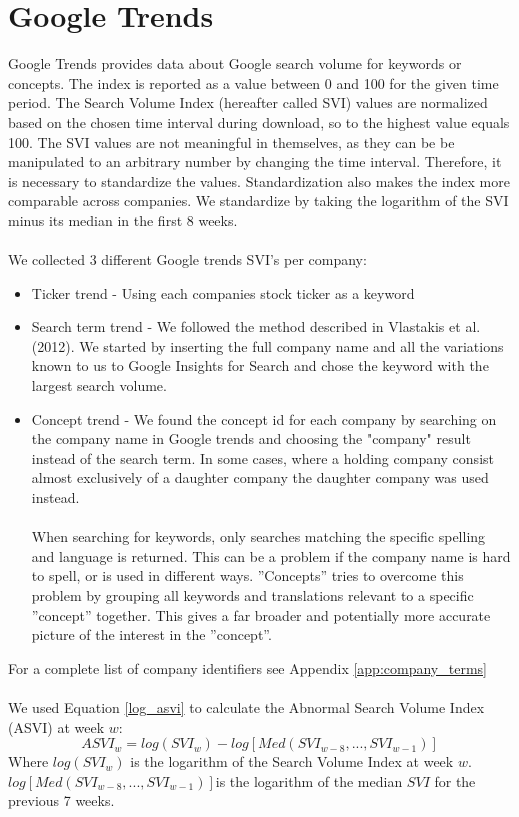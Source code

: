 \section{Google Trends}
Google Trends provides data about Google search volume for keywords or concepts. The index is reported as a value between 0 and 100 for the given time period. The Search Volume Index (hereafter called SVI) values are normalized based on the chosen time interval during download, so to the highest value equals 100. The SVI values are not meaningful in themselves, as they can be be manipulated to an arbitrary number by changing the time interval. Therefore, it is necessary to standardize the values. Standardization also makes the index more comparable across companies. We standardize by taking the logarithm of the SVI minus its median in the first 8 weeks. 
\\\\
We collected 3 different Google trends SVI's per company:
\begin{itemize}
\item Ticker trend - Using each companies stock ticker as a keyword
\item Search term trend - We followed the method described in Vlastakis et al. (2012). We started by inserting the full company name and all the variations known to us to Google Insights for Search and chose the keyword with the largest search volume.
\item Concept trend - We found the concept id for each company by searching on the company name in Google trends and choosing the "company" result instead of the search term. In some cases, where a holding company consist almost exclusively of a daughter company the daughter company was used instead.
\\\\
When searching for keywords, only searches matching the specific spelling and language is returned. This can be a problem if the company name is hard to spell, or is used in different ways. ”Concepts” tries to overcome this problem by grouping all keywords and translations relevant to a specific ”concept” together. This gives a far broader and potentially more accurate picture of the interest in the ”concept”.
\end{itemize}
For a complete list of company identifiers see Appendix \ref{app:company_terms}
\\\\
We used Equation \eqref{log_asvi} to calculate the Abnormal Search Volume Index (ASVI) at week $w$:
\begin{equation}
   \label{log_asvi} 
   ASVI_{w} = log(SVI_{w}) - log[Med(SVI_{w-8},...,SVI_{w-1})] 
\end{equation}
Where $log(SVI_{w})$ is the logarithm of the Search Volume Index at week $w$. $log[Med(SVI_{w-8},...,SVI_{w-1})]$is the logarithm of the median $SVI$ for the previous 7 weeks.

